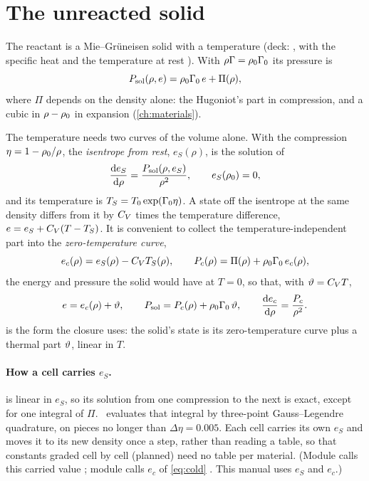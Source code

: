 \section{The unreacted solid}
\label{sec:solid}

The reactant is a Mie--Gr\"uneisen solid with a temperature (deck:
, with the specific heat  and the
temperature at rest ). With $\rho\Gamma = \rho_0\Gamma_0$ its pressure is
\begin{equation}
  P_{\mathrm{sol}}(\rho, e) = \rho_0\Gamma_0\, e + \Pi(\rho),
  \label{eq:mg}
\end{equation}
where $\Pi$ depends on the density alone: the Hugoniot's part in
compression, and a cubic in $\rho - \rho_0$ in expansion (\cref{ch:materials}).

The temperature needs two curves of the volume alone. With the
compression $\eta = 1 - \rho_0/\rho$, the \emph{isentrope from rest},
$e_S(\rho)$, is the solution of
\begin{equation}
  \frac{\mathrm{d} e_S}{\mathrm{d}\rho} = \frac{P_{\mathrm{sol}}(\rho, e_S)}{\rho^2},
  \qquad e_S(\rho_0) = 0,
  \label{eq:isentrope}
\end{equation}
and its temperature is $T_S = T_0\exp(\Gamma_0\eta)$. A state off the isentrope
at the same density differs from it by $C_{V}$ times the temperature
difference, $e = e_S + C_{V}(T - T_S)$. It is convenient to collect the
temperature-independent part into the \emph{zero-temperature curve},
\begin{equation}
  e_c(\rho) = e_S(\rho) - C_{V} T_S(\rho), \qquad
  P_{c}(\rho) = \Pi(\rho) + \rho_0\Gamma_0\, e_c(\rho),
  \label{eq:cold}
\end{equation}
the energy and pressure the solid would have at $T = 0$, so that, with
$\vartheta = C_{V} T$,
\begin{equation}
  e = e_c(\rho) + \vartheta, \qquad
  P_{\mathrm{sol}} = P_{c}(\rho) + \rho_0\Gamma_0\,\vartheta, \qquad
  \frac{\mathrm{d} e_c}{\mathrm{d}\rho} = \frac{P_{c}}{\rho^2}.
  \label{eq:solid-theta}
\end{equation}
 is the form the closure uses: the solid's state is
its zero-temperature curve plus a thermal part $\vartheta$, linear in $T$.

\paragraph{How a cell carries $e_S$.}  is linear in
$e_S$, so its solution from one compression to the next is exact, except for
one integral of $\Pi$. \bw\ evaluates that integral by three-point
Gauss--Legendre quadrature, on pieces no longer than $\Delta\eta = 0.005$. Each cell carries
its own $e_S$ and moves it to its new density once a step, rather than
reading a table, so that constants graded cell by cell (planned) need no
table per material. (Module  calls this carried value
; module  calls $e_c$ of \cref{eq:cold}
. This manual uses $e_S$ and $e_c$.)

